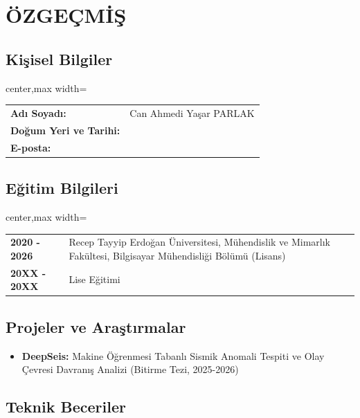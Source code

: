 \chapter*{ÖZGEÇMİŞ}

\section*{Kişisel Bilgiler}

\begin{adjustbox}{center,max width=\textwidth}
\begin{tabular}{ll}
\textbf{Adı Soyadı:} & Can Ahmedi Yaşar PARLAK \\
\textbf{Doğum Yeri ve Tarihi:} & \\
\textbf{E-posta:} & \\
\end{tabular}
\end{adjustbox}

\section*{Eğitim Bilgileri}

\begin{adjustbox}{center,max width=\textwidth}
\begin{tabular}{p{3cm}p{9.5cm}}
\textbf{2020 - 2026} & Recep Tayyip Erdoğan Üniversitesi, Mühendislik ve Mimarlık Fakültesi, Bilgisayar Mühendisliği Bölümü (Lisans) \\
\textbf{20XX - 20XX} & Lise Eğitimi \\
\end{tabular}
\end{adjustbox}

\section*{Projeler ve Araştırmalar}

\begin{itemize}
    \item \textbf{DeepSeis:} Makine Öğrenmesi Tabanlı Sismik Anomali Tespiti ve Olay Çevresi Davranış Analizi (Bitirme Tezi, 2025-2026)
\end{itemize}

\section*{Teknik Beceriler}

